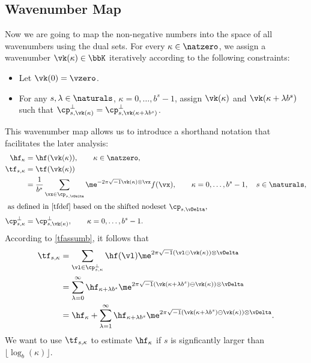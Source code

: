 \documentclass[]{elsarticle}
\theoremstyle{definition}
\begin{document}
\subsection{Wavenumber Map}

Now we are going to map the non-negative numbers into the space of all wavenumbers using the dual sets.  For every $\kappa \in \natzero$, we assign a wavenumber $\vk(\kappa) \in \bbK$ iteratively according to the following constraints: 
\begin{itemize}

\item Let $\vk(0)= \vzero$.

\item For any $s,\lambda \in \naturals$, $\kappa=0, \ldots, b^s-1$, assign $\vk(\kappa)$ and $\vk(\kappa+ \lambda b^s)$ such that $\cp^{\perp}_{s,\vk(\kappa)}=\cp^{\perp}_{s,\vk(\kappa+ \lambda b^s)}$.
\end{itemize}

This wavenumber map allows us to introduce a shorthand notation that facilitates the later analysis:
\begin{align*}
\hf_{\kappa} & =\hf(\vk(\kappa)), \qquad \kappa \in \natzero,\\
\tf_{s,\kappa}& = \tf(\vk(\kappa)) \\
& = \frac{1}{b^s} \sum_{\vx \in \cp_{s,\vDelta}} \me^{-2 \pi \sqrt{-1} \vk(\kappa) \otimes \vx} f(\vx), \qquad \kappa=0, \ldots, b^s-1, \quad s \in \naturals,\\
\intertext{ as defined in \eqref{tfdef} based on the shifted nodeset $\cp_{s,\vDelta}$,}
\cp^{\perp}_{s,\kappa}&=\cp^{\perp}_{s,\vk(\kappa)}, \qquad \kappa=0, \ldots, b^s-1.
\end{align*}
According to \eqref{tfassumb}, it follows that 
\begin{align}
\nonumber
\tf_{s,\kappa} &= \sum_{\vl \in \cp^{\perp}_{s,\kappa}} \hf(\vl) \me^{2 \pi \sqrt{-1} (\vl \ominus \vk(\kappa)) \otimes \vDelta} \\
\nonumber
&= \sum_{\lambda=0}^{\infty} \hf_{\kappa+\lambda b^{s}} \me^{2 \pi \sqrt{-1} (\vk(\kappa+\lambda b^{s}) \ominus \vk(\kappa)) \otimes \vDelta} \\
& = \hf_{\kappa} + \sum_{\lambda=1}^{\infty} \hf_{\kappa+\lambda b^{s}} \me^{2 \pi \sqrt{-1} (\vk(\kappa+\lambda b^{s}) \ominus \vk(\kappa)) \otimes \vDelta}.
\label{tfassumc}
\end{align}
We want to use $\tf_{s,\kappa}$ to estimate $\hf_{\kappa}$ if $s$ is signficantly larger than $\lfloor \log_b(\kappa) \rfloor$.
\end{document}
